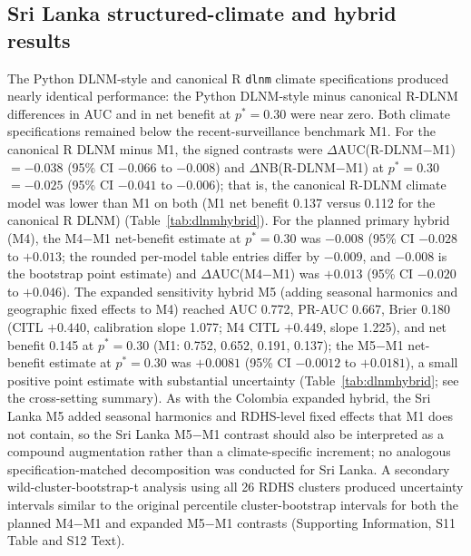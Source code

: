 \documentclass[11pt,a4paper]{article}
\begin{document}
\subsection{Sri Lanka structured-climate and hybrid results}
The Python DLNM-style and canonical R \texttt{dlnm} climate specifications produced nearly identical performance: the Python DLNM-style minus canonical R-DLNM differences in AUC and in net benefit at $p^*=0.30$ were near zero. Both climate specifications remained below the recent-surveillance benchmark M1. For the canonical R DLNM minus M1, the signed contrasts were $\Delta$AUC(R\nobreakdash-DLNM$-$M1) $=-0.038$ (95\% CI $-0.066$ to $-0.008$) and $\Delta$NB(R\nobreakdash-DLNM$-$M1) at $p^*=0.30$ $=-0.025$ (95\% CI $-0.041$ to $-0.006$); that is, the canonical R-DLNM climate model was lower than M1 on both (M1 net benefit 0.137 versus 0.112 for the canonical R DLNM) (Table~\ref{tab:dlnmhybrid}). For the planned primary hybrid (M4), the M4$-$M1 net-benefit estimate at $p^*=0.30$ was $-0.008$ (95\% CI $-0.028$ to $+0.013$; the rounded per-model table entries differ by $-0.009$, and $-0.008$ is the bootstrap point estimate) and $\Delta$AUC(M4$-$M1) was $+0.013$ (95\% CI $-0.020$ to $+0.046$). The expanded sensitivity hybrid M5 (adding seasonal harmonics and geographic fixed effects to M4) reached AUC 0.772, PR-AUC 0.667, Brier 0.180 (CITL $+0.440$, calibration slope 1.077; M4 CITL $+0.449$, slope 1.225), and net benefit 0.145 at $p^*=0.30$ (M1: 0.752, 0.652, 0.191, 0.137); the M5$-$M1 net-benefit estimate at $p^*=0.30$ was $+0.0081$ (95\% CI $-0.0012$ to $+0.0181$), a small positive point estimate with substantial uncertainty (Table~\ref{tab:dlnmhybrid}; see the cross-setting summary). As with the Colombia expanded hybrid, the Sri Lanka M5 added seasonal harmonics and RDHS-level fixed effects that M1 does not contain, so the Sri Lanka M5$-$M1 contrast should also be interpreted as a compound augmentation rather than a climate-specific increment; no analogous specification-matched decomposition was conducted for Sri Lanka. A secondary wild-cluster-bootstrap-t analysis using all 26 RDHS clusters produced uncertainty intervals similar to the original percentile cluster-bootstrap intervals for both the planned M4$-$M1 and expanded M5$-$M1 contrasts (Supporting Information, S11 Table and S12 Text).
\end{document}
